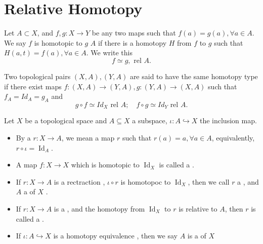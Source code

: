 \documentclass[../main.tex]{subfiles}
\begin{document}
\section{Relative Homotopy}

\begin{definition}{}{}
Let $A \subset X$, and $f,g : X \longrightarrow Y$ be any two maps such that $f(a) = g(a), \forall a \in A$. We say $f$ is homotopic to $g$  $A$ if there is a homotopy $H$ from $f$ to $g$ such that $H(a,t) = f(a), \forall a \in A$. We write this
\[
f \simeq g, \text{ rel } A.
\]
\end{definition}
\begin{definition}{}{} 
Two topological pairs $(X, A), (Y, A)$ are said to have the same homotopy type if there exist maps $f : (X, A) \to (Y, A), g : (Y, A) \to (X, A)$ such that $f_A = Id_A = g_A$ and
\[
g \circ f \simeq Id_X \text{ rel } A; \quad f \circ g \simeq Id_Y \text{ rel } A.
\]
\end{definition}

\begin{definition}{}{}
    Let \(  X  \) be a topological space and \(  A\subseteq X  \) a subspace, \(  \iota :A\hookrightarrow X  \) the inclusion map. 
    
    \begin{itemize}
        \item By a  \(  r:X\to A  \), we mean a map \(  r  \) such that \(  r\left( a \right)= a, \forall a \in  A  \), equivalently, \(  r\circ \iota = \operatorname{Id}_{A}  \).    
        \item A map \(  f:X\to X  \) which is homotopic to \(  \operatorname{Id}_{X}  \) is called a .
        \item If \(  r :X\to A \) is a rectraction   , \( \iota \circ r  \) is homotopoc to \(  \operatorname{Id}_{X}  \), then we call \(  r  \) a , and \(  A  \) a  of \(  X  \) .
        \item If \(  r:X\to A  \) is a , and the homotopy from \(  \operatorname{Id}_{X}  \) to \(  r  \) is relative to \(  A  \), then \(  r  \) is called a .     
        \item If \(  \iota :A\hookrightarrow X  \) is a homotopy equivalence , then we say \(  A  \) is a  of \(  X  \)   
    \end{itemize}
    
\end{definition}
\end{document}
